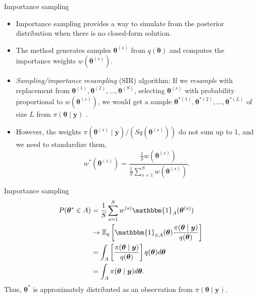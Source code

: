 \documentclass[12pt, compress]{beamer}
\begin{document}
\begin{frame}{Importance sampling}
	\begin{itemize}
		\item Importance sampling provides a way to simulate from the posterior distribution when there is no closed-form solution.
		\item The method generates samples $\bm{\theta}^{(s)}$ from $q(\bm{\theta})$ and computes the importance weights $w(\bm{\theta}^{(s)})$. 
		\item \textit{Sampling/importance resampling} (SIR) algorithm: If we \textit{resample} with replacement from $\bm{\theta}^{(1)},\bm{\theta}^{(2)},\dots,\bm{\theta}^{(S)}$, selecting $\bm{\theta}^{(s)}$ with probability proportional to  $w(\bm{\theta}^{(s)})$, we would get a sample $\bm{\theta}^{*(1)},\bm{\theta}^{*(2)},\dots,\bm{\theta}^{*(L)}$ of size $L$ from $\pi(\bm{\theta}\mid \bm{y})$ \citep{smith1992bayesian,rubin1988sir}. 
		\item However, the weights $\pi(\bm{\theta}^{(s)}\mid \bm{y})/(Sq(\bm{\theta}^{(s)}))$ do not sum up to 1, and we need to standardize them, 
		$$w^*(\bm{\theta}^{(s)})=\frac{\frac{1}{S} w(\bm{\theta}^{(s)})}{\frac{1}{S}\sum_{s=1}^Sw(\bm{\theta}^{(s)})}.$$   
	\end{itemize}
\end{frame}


\begin{frame}{Importance sampling}
\begin{align*}
	P(\bm{\theta}^*\in A)
	&=\frac{1}{S}\sum_{s=1}^S{w}^{(s)}\mathbbm{1}_{A}(\bm{\theta}^{(s)})\\
	&\rightarrow \mathbb{E}_q\left[\mathbbm{1}_{\in A}(\bm{\theta})\frac{\pi(\bm{\theta}\mid \bm{y})}{q(\bm{\theta})}\right]\\
	&=\int_{A}\left[\frac{\pi(\bm{\theta}\mid \bm{y})}{q(\bm{\theta})}\right]q(\bm{\theta})d\bm{\theta}\\
	&=\int_{A}\pi(\bm{\theta}\mid \bm{y})d\bm{\theta}. 
\end{align*}
Thus, $\bm{\theta}^*$ is approximately distributed as an observation from $\pi(\bm{\theta}\mid \bm{y})$. 
\end{frame}
\end{document}
